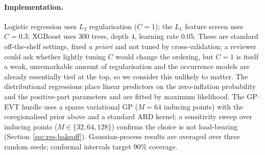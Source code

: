 \documentclass[11pt,a4paper]{article}
\begin{document}
\paragraph{Implementation.} Logistic regression uses $L_2$ regularisation
($C=1$); the $L_1$ feature screen uses $C=0.3$; XGBoost uses $300$ trees, depth
$4$, learning rate $0.05$. These are standard off-the-shelf settings, fixed
\emph{a priori} and {not tuned by cross-validation}; a reviewer could ask
whether lightly tuning $C$ would change the ordering, but $C=1$ is itself a weak,
unremarkable amount of regularisation and the occurrence models are already
essentially tied at the top, so we consider this unlikely to matter. The
distributional regressions
place linear predictors on the zero-inflation probability and the positive-part
parameters and are fitted by maximum likelihood. The GP--EVT hurdle uses a sparse
variational GP ($M=64$ inducing points) with the coregionalised prior above and a
standard ARD kernel; a sensitivity sweep over inducing points
($M\in\{32,64,128\}$) confirms the choice is not load-bearing
(Section~\ref{sec:res-bakeoff}). Gaussian-process results are averaged over three
random seeds; conformal intervals target $90\%$ coverage.

\end{document}
